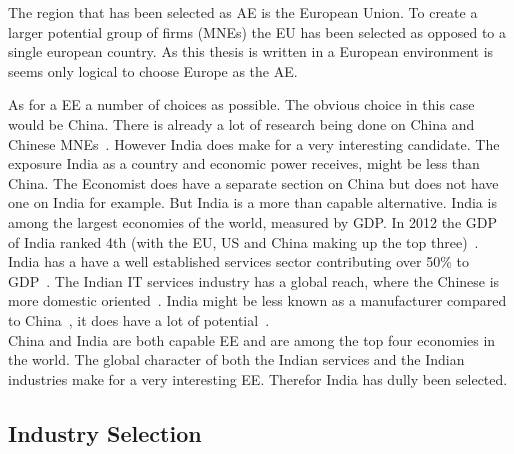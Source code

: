 The region that has been selected as \gls{AE} is the European Union. 
To create a larger potential group of firms (MNEs) the \gls{EU} has been selected as opposed to a single european country.
As this thesis is written in a European environment is seems only logical to choose Europe as the \gls{AE}.

As for a \gls{EE} a number of choices as possible.
The obvious choice in this case would be China.
There is already a lot of research being done on China and Chinese MNEs~\citep{Deng:2012to,Alon:2011um}.
However India does make for a very interesting candidate.
The exposure India as a country and economic power receives, might be less than China.
The Economist does have a separate section on China but does not have one on India for example.
But India is a more than capable alternative.
India is among the largest economies of the world, measured by \gls{GDP}.
In 2012 the \gls{GDP} of India ranked 4th (with the EU, US and China making up the top three)~\citep{CIA:2013}.
India has a have a well established services sector contributing over 50\% to \gls{GDP}~\citep{Government-of-India:2012}.
The Indian IT services industry has a global reach, where the Chinese is more domestic oriented~\cite{Raman:2011jm}.
India might be less known as a manufacturer compared to China~\citep{Daily-Mail:2010}, it does have a lot of potential~\citep{Dhawan:2012ws}.\\
China and India are both capable EE and are among the top four economies in the world.
The global character of both the Indian services and the Indian \manu industries make for a very interesting \gls{EE}.
Therefor India has dully been selected.


\subsection{Industry Selection}\label{sec:rational}

